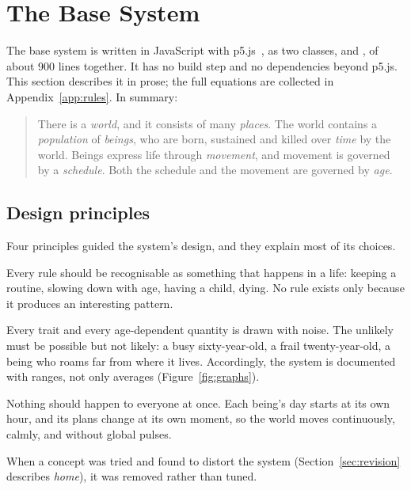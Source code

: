 \section{The Base System}
\label{sec:system}

The base system is written in JavaScript with p5.js~\cite{p5js}, as two classes,  and , of about 900 lines together. It has no build step and no dependencies beyond p5.js. This section describes it in prose; the full equations are collected in Appendix~\ref{app:rules}. In summary:

\begin{quote}
There is a \emph{world}, and it consists of many \emph{places}. The world contains a \emph{population} of \emph{beings}, who are born, sustained and killed over \emph{time} by the world. Beings express life through \emph{movement}, and movement is governed by a \emph{schedule}. Both the schedule and the movement are governed by \emph{age}.
\end{quote}

\subsection{Design principles}

Four principles guided the system's design, and they explain most of its choices.

\begin{description}[leftmargin=1.2em, font=\normalfont\itshape]
  \item[Rules from life, not from form.] Every rule should be recognisable as something that happens in a life: keeping a routine, slowing down with age, having a child, dying. No rule exists only because it produces an interesting pattern.
  \item[Noise is intended.] Every trait and every age-dependent quantity is drawn with noise. The unlikely must be possible but not likely: a busy sixty-year-old, a frail twenty-year-old, a being who roams far from where it lives. Accordingly, the system is documented with ranges, not only averages (Figure~\ref{fig:graphs}).
  \item[No lockstep.] Nothing should happen to everyone at once. Each being's day starts at its own hour, and its plans change at its own moment, so the world moves continuously, calmly, and without global pulses.
  \item[Nothing is added that life does not suggest.] When a concept was tried and found to distort the system (Section~\ref{sec:revision} describes \emph{home}), it was removed rather than tuned.
\end{description}

